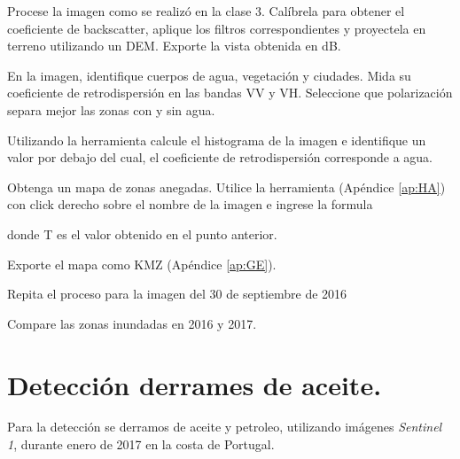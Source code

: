 \begin{que}
    Procese la imagen como se realizó en la clase 3. Calíbrela para obtener el coeficiente de backscatter, aplique los filtros correspondientes y proyectela en terreno utilizando un DEM. Exporte la vista obtenida en dB.
\end{que}

\begin{que}
    En la imagen, identifique cuerpos de agua, vegetación y ciudades. Mida su coeficiente de retrodispersión en las bandas VV y VH. Seleccione que polarización separa mejor las zonas con y sin agua.
\end{que}

\begin{que}
    Utilizando la herramienta  calcule el histograma de la imagen e identifique un valor por debajo del cual, el coeficiente de retrodispersión corresponde a agua.
\end{que}

\begin{que}
    Obtenga un mapa de zonas anegadas. Utilice la herramienta  (Apéndice \ref{ap:HA}) con click derecho sobre el nombre de la imagen e ingrese la formula
    \begin{center}
    \end{center}
    donde T es el valor obtenido en el punto anterior.
\end{que}

\begin{que}
    Exporte el mapa como KMZ (Apéndice \ref{ap:GE}).
\end{que}

\begin{que}
    Repita el proceso para la imagen del 30 de septiembre de 2016
    \begin{center}
    \end{center}
\end{que}

\begin{que}
    Compare las zonas inundadas en 2016 y 2017.
\end{que}

\section{Detección derrames de aceite.}

Para la detección se derramos de aceite y petroleo, utilizando imágenes \emph{Sentinel 1}, durante enero de 2017 en la costa de Portugal.

